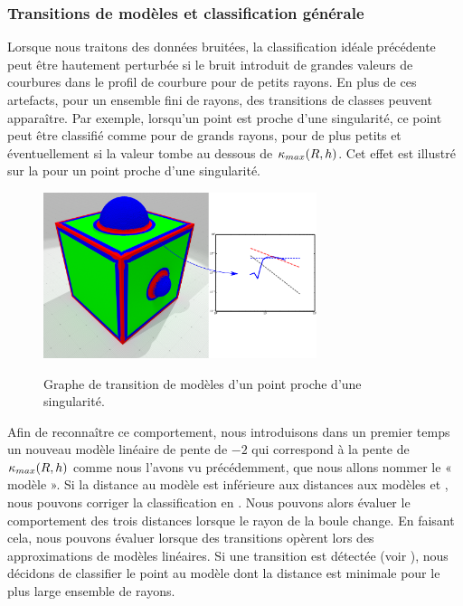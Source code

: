 \subsubsection{Transitions de modèles et classification générale}%
\label{sec:applications:feature:II:transitions}
%
Lorsque nous traitons des données bruitées, la classification idéale précédente
peut être hautement perturbée si le bruit introduit de grandes valeurs de
courbures dans le profil de courbure pour de petits rayons. En plus de ces
artefacts, pour un ensemble fini de rayons, des transitions de classes peuvent
apparaître. Par exemple, lorsqu'un point est proche d'une singularité, ce point
peut être classifié comme \featedge pour de grands rayons, \featsmooth pour de
plus petits et éventuellement \featflat si la valeur tombe au dessous de
$\kappa_{max}(R,h)$. Cet effet est illustré sur la  pour un
point proche d'une singularité.
%
\begin{figure}
\begin{center}
  {\includegraphics[width=8cm]{figures/CubeSpherePlot_transition}}
  \caption{Graphe de transition de modèles d'un point proche d'une singularité.}
  \label{fig:inversion}
\end{center}
\end{figure}
%
Afin de reconnaître ce comportement, nous introduisons dans un premier temps un
nouveau modèle linéaire de pente de $-2$ qui correspond à la pente de
$\kappa_{max}(R,h)$ comme nous l'avons vu précédemment, que nous allons nommer le «
modèle \featflat ». Si la distance au modèle \featflat est inférieure aux
distances aux modèles \featsmooth et \featedge, nous pouvons corriger la
classification en \featflat. Nous pouvons alors évaluer le comportement des
trois distances lorsque le rayon de la boule change. En faisant cela, nous
pouvons évaluer lorsque des transitions opèrent lors des approximations de
modèles linéaires. Si une transition est détectée (voir
), nous décidons de classifier le point au modèle dont
la distance est minimale pour le plus large ensemble de rayons.


